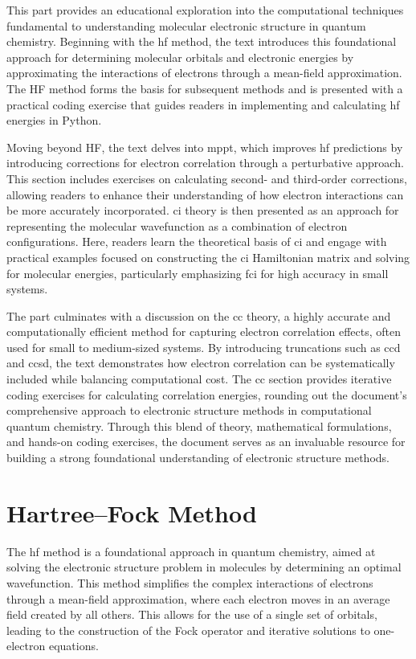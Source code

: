 
This part provides an educational exploration into the computational techniques fundamental to understanding molecular electronic structure in quantum chemistry. Beginning with the \acrfull{hf} method, the text introduces this foundational approach for determining molecular orbitals and electronic energies by approximating the interactions of electrons through a mean-field approximation. The HF method forms the basis for subsequent methods and is presented with a practical coding exercise that guides readers in implementing and calculating \acrshort{hf} energies in Python.

Moving beyond HF, the text delves into \acrfull{mppt}, which improves \acrshort{hf} predictions by introducing corrections for electron correlation through a perturbative approach. This section includes exercises on calculating second- and third-order corrections, allowing readers to enhance their understanding of how electron interactions can be more accurately incorporated. \acrfull{ci} theory is then presented as an approach for representing the molecular wavefunction as a combination of electron configurations. Here, readers learn the theoretical basis of \acrshort{ci} and engage with practical examples focused on constructing the \acrshort{ci} Hamiltonian matrix and solving for molecular energies, particularly emphasizing \acrfull{fci} for high accuracy in small systems.

The part culminates with a discussion on the \acrfull{cc} theory, a highly accurate and computationally efficient method for capturing electron correlation effects, often used for small to medium-sized systems. By introducing truncations such as \acrfull{ccd} and \acrfull{ccsd}, the text demonstrates how electron correlation can be systematically included while balancing computational cost. The \acrshort{cc} section provides iterative coding exercises for calculating correlation energies, rounding out the document's comprehensive approach to electronic structure methods in computational quantum chemistry. Through this blend of theory, mathematical formulations, and hands-on coding exercises, the document serves as an invaluable resource for building a strong foundational understanding of electronic structure methods.
\chapter{Hartree--Fock Method}

The \acrshort{hf} method is a foundational approach in quantum chemistry, aimed at solving the electronic structure problem in molecules by determining an optimal wavefunction. This method simplifies the complex interactions of electrons through a mean-field approximation, where each electron moves in an average field created by all others. This allows for the use of a single set of orbitals, leading to the construction of the Fock operator and iterative solutions to one-electron equations.

